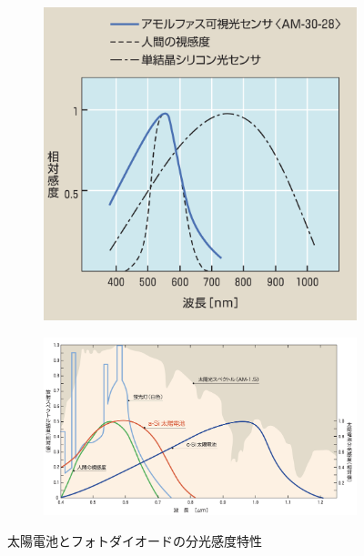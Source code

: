 \begin{figure}
	\centering
	\begin{subfigure}{0.3\linewidth}
		\centering
		\includegraphics[width=0.9\linewidth]{src/figures/consi1/photodiode.png}
		\label{subfig:bunkoukando}
	\end{subfigure}
	\begin{subfigure}{0.6\linewidth}
		\centering
		\includegraphics[width=0.9\linewidth]{src/figures/consi1/solarcell.png}
		\label{subfig:solarcell}
	\end{subfigure}
	\caption{太陽電池とフォトダイオードの分光感度特性}\label{fig:bunkoukando}
\end{figure}
